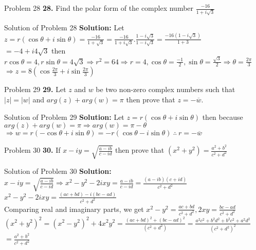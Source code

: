 \documentclass[aspectratio=169,8pt]{beamer}
\begin{document}
\begin{frame}{Problem 28}
  \textbf{28.} Find the polar form of the complex number $\frac{-16}{1 + i\sqrt{3}}$
\end{frame}
\begin{frame}{Solution of Problem 28}
  \textbf{Solution:} Let $z = r(\cos\theta + i\sin\theta) = \frac{-16}{1 + \sqrt{3}} = \frac{-16}{1 + i\sqrt{3}}.\frac{1 - i\sqrt{3}}{1 - i\sqrt{3}} = \frac{-16(1 - i\sqrt{3})}{1 + 3}$\\
  \vspace*{0.2cm}
  $= -4 + i4\sqrt{3}$ then $r\cos\theta = 4, r\sin\theta = 4\sqrt{3} \Rightarrow r^2 = 64 \Rightarrow r = 4, \cos\theta = \frac{-1}{2}, \sin\theta = \frac{\sqrt{3}}{2} \Rightarrow \theta = \frac{2\pi}{3}$\\
  \vspace*{0.2cm}
  $\Rightarrow z = 8\left(\cos\frac{2\pi}{3} + i\sin\frac{2\pi}{3}\right)$
\end{frame}
\begin{frame}{Problem 29}
  \textbf{29.} Let $z$ and $w$ be two non-zero complex numbers such that $|z| = |w|$ and $arg(z) + arg(w) = \pi$ then prove that $z = -\overline{w}.$
\end{frame}
\begin{frame}{Solution of Problem 29}
  \textbf{Solution:} Let $z = r(\cos\theta + i\sin\theta)$ then because $arg(z) + arg(w) = \pi \Rightarrow arg(w) = \pi - \theta$\\
  \vspace*{0.2cm}
  $\Rightarrow w = r(-\cos\theta + i\sin\theta) = -r(\cos\theta - i\sin\theta)~\therefore~r = -\overline{w}$
\end{frame}
\begin{frame}{Problem 30}
  \textbf{30.} If $x - iy = \sqrt{\frac{a - ib}{c - id}}$ then prove that $(x^2 + y^2) = \frac{a^2 + b^2}{c^2 + d^2}$
\end{frame}
\begin{frame}{Solution of Problem 30}
  \textbf{Solution:} $x - iy = \sqrt{\frac{a - ib}{c - id}} \Rightarrow x^2 - y^2 - 2ixy = \frac{a - ib}{c - id} = \frac{(a - ib)(c + id)}{c^2 + d^2}$\\
  \vspace*{0.2cm}
  $x^2 - y^2 - 2ixy = \frac{(ac + bd) -i(bc - ad)}{c^2 + d^2}$\\
  \vspace*{0.2cm}
  Comparing real and imaginary parts, we get $x^2 - y^2 = \frac{ac + bd}{c^2 + d^2}, 2xy = \frac{bc - ad}{c^2 + d^2}$\\
  \vspace*{0.2cm}
  $(x^2 + y^2)^2 = (x^2 - y^2)^2 + 4x^2y^2 = \frac{(ac + bd)^2 + (bc - ad)^2}{(c^2 + d^2)} = \frac{a^2c^2 + b^2d^2 + b^2c^2 + a^2d^2}{(c^2 + d^2)^2}$\\
  \vspace*{0.2cm}
  $= \frac{a^2 + b^2}{c^2 + d^2}$
\end{frame}
\end{document}
